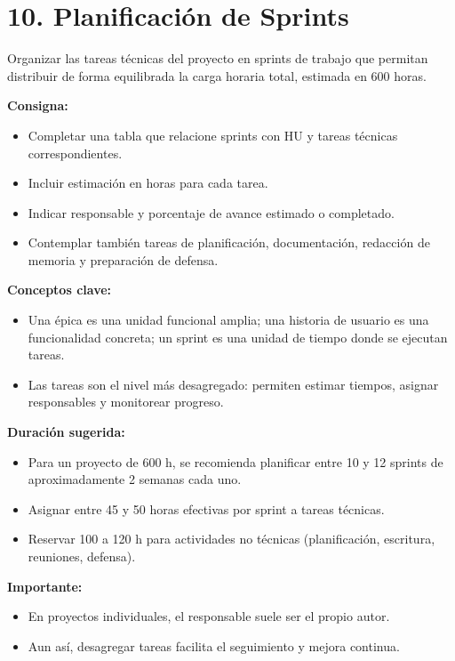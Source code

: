 \documentclass[
11pt, %
]{charter}
\begin{document}







\section{10. Planificación de Sprints}

Organizar las tareas técnicas del proyecto en sprints de trabajo que permitan distribuir de forma equilibrada la carga horaria total, estimada en 600 horas.

\textbf{Consigna:}
\begin{itemize}
  \item Completar una tabla que relacione sprints con HU y tareas técnicas correspondientes.
  \item Incluir estimación en horas para cada tarea.
  \item Indicar responsable y porcentaje de avance estimado o completado.
  \item Contemplar también tareas de planificación, documentación, redacción de memoria y preparación de defensa.
\end{itemize}

\textbf{Conceptos clave:}
\begin{itemize}
  \item Una \'{e}pica es una unidad funcional amplia; una historia de usuario es una funcionalidad concreta; un sprint es una unidad de tiempo donde se ejecutan tareas.
  \item Las tareas son el nivel más desagregado: permiten estimar tiempos, asignar responsables y monitorear progreso.
\end{itemize}

\textbf{Duración sugerida:}
\begin{itemize}
  \item Para un proyecto de 600 h, se recomienda planificar entre 10 y 12 sprints de aproximadamente 2 semanas cada uno.
  \item Asignar entre 45 y 50 horas efectivas por sprint a tareas técnicas.
  \item Reservar 100 a 120 h para actividades no técnicas (planificación, escritura, reuniones, defensa).
\end{itemize}

\textbf{Importante:}
\begin{itemize}
  \item En proyectos individuales, el responsable suele ser el propio autor.
  \item Aun así, desagregar tareas facilita el seguimiento y mejora continua.
\end{itemize}
\end{document}
